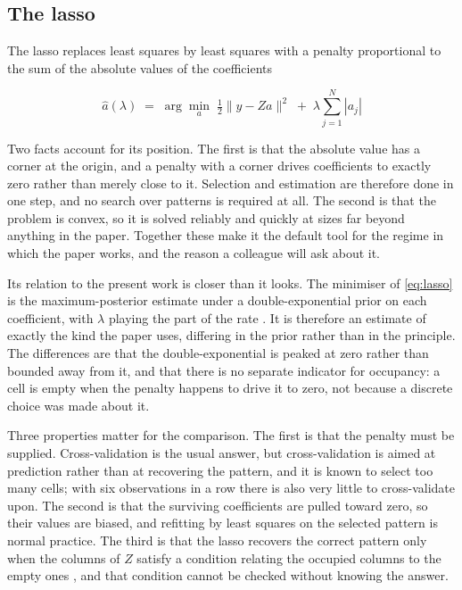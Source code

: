 \subsection{The lasso}
\label{sec:lasso}

The lasso \cite{tibshirani1996} replaces least squares by least squares with a
penalty proportional to the sum of the absolute values of the coefficients

\begin{equation}
\hat{a}(\lambda) \;=\; \arg\min_{a} \; \tfrac{1}{2} \| y - Z a \|^{2}
\;+\; \lambda \sum_{j=1}^{N} |a_{j}|
\label{eq:lasso}
\end{equation}

Two facts account for its position. The first is that the absolute value has a
corner at the origin, and a penalty with a corner drives coefficients to exactly
zero rather than merely close to it. Selection and estimation are therefore done in
one step, and no search over patterns is required at all. The second is that the
problem is convex, so it is solved reliably and quickly at sizes far beyond
anything in the paper. Together these make it the default tool for the regime in
which the paper works, and the reason a colleague will ask about it.

Its relation to the present work is closer than it looks. The minimiser of
\eqref{eq:lasso} is the maximum-posterior estimate under a double-exponential prior
on each coefficient, with $\lambda$ playing the part of the rate
\cite{park2008}. It is therefore an estimate of exactly the kind the paper uses,
differing in the prior rather than in the principle. The differences are that the
double-exponential is peaked at zero rather than bounded away from it, and that
there is no separate indicator for occupancy: a cell is empty when the penalty
happens to drive it to zero, not because a discrete choice was made about it.

Three properties matter for the comparison. The first is that the penalty must be
supplied. Cross-validation is the usual answer, but cross-validation is aimed at
prediction rather than at recovering the pattern, and it is known to select too
many cells; with six observations in a row there is also very little to
cross-validate upon. The second is that the surviving coefficients are pulled
toward zero, so their values are biased, and refitting by least squares on the
selected pattern is normal practice. The third is that the lasso recovers the
correct pattern only when the columns of $Z$ satisfy a condition relating the
occupied columns to the empty ones \cite{zhao2006}, and that condition cannot be
checked without knowing the answer.

